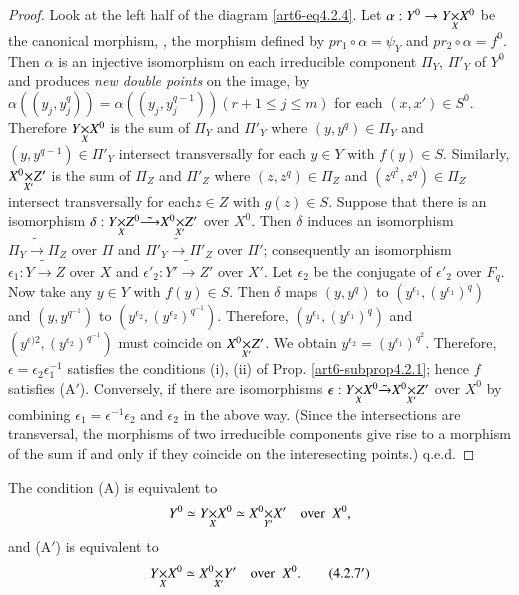 \begin{proof}
Look at the left half of the diagram \eqref{art6-eq4.2.4}. Let $\alpha : Y^0 \to \fprod{Y}{X^0}{X}$ be the canonical morphism, \ie, the morphism defined by $pr_1 \circ \alpha = \psi_Y$ and $pr_2 \circ \alpha = f^0$. Then $\alpha$ is an injective isomorphism on each irreducible component $\Pi_Y$, $\Pi'_Y$ of $Y^0$ and produces \textit{new double points} on the image, by $\alpha((y_j, y^q_j)) = \alpha ((y_j, y_j^{q-1})) (r + 1 \leqslant j \leqslant m)$ for each $(x, x') \in S^0$. Therefore $\fprod{Y}{X^0}{X}$ is the sum of $\Pi_Y$ and $\Pi'_Y$ where $(y, y^q) \in \Pi_Y$ and $(y, y^{q-1}) \in \Pi'_Y$ intersect transversally for each $y \in Y$ with $f (y) \in S$. Similarly, $\fprod{X^0}{Z'}{X'}$ is the sum of $\Pi_Z$ and $\Pi'_Z$ where  $(z,z^q) \in \Pi_Z$ and $(z^{q^2}, z^q) \in \Pi_Z$ intersect transversally for each\pageoriginale $z \in Z$ with $g(z) \in S$. Suppose that there is an isomorphism $\delta: \fprod{Y}{Z^0}{X} \tilde{\longrightarrow} \fprod{X^0}{Z'}{X'}$ over $X^0$. Then $\delta$ induces an isomorphism $\Pi_Y \tilde{\longrightarrow} \Pi_Z$ over $\Pi$ and $\Pi'_Y \tilde{\longrightarrow} \Pi'_Z$ over $\Pi'$; consequently an isomorphism $\epsilon_1 : Y \tilde{\longrightarrow} Z$ over $X$ and $\epsilon'_2 : Y' \tilde{\longrightarrow} Z'$ over $X'$. Let $\epsilon_2$ be the conjugate of $\epsilon'_2$ over $F_q$. Now take any $y \in Y$ with $f(y) \in S$. Then $\delta$ maps $(y, y^q)$ to $(y^{\epsilon_1}, (y^{\epsilon_1})^q)$ and $(y, y^{q^{-1}})$ to $(y^{\epsilon_2}, (y^{\epsilon_2})^{q^{-1}})$. Therefore, $(y^{\epsilon_1}, (y^{\epsilon_1})^q)$ and $(y^{\epsilon)2}, (y^{\epsilon_2})^{q^{-1}})$ must coincide on $\fprod{X^0}{Z'}{X'}$. We obtain $y^{\epsilon_2} = (y^{\epsilon_1})^{q^2}$. Therefore, $\epsilon = \epsilon_2 \epsilon^{-1}_1$ satisfies the conditions (i), (ii) of Prop. \ref{art6-subprop4.2.1}; hence $f$ satisfies (A$'$). Conversely, if there are isomorphisms $\epsilon: \fprod{Y}{X^0}{X} \tilde{\to} \fprod{X^0}{Z'}{X'}$ over $X^0$ by combining $\epsilon_1 = \epsilon^{-1} \epsilon_2$ and $\epsilon_2$ in the above way. (Since the intersections are transversal, the morphisms of two irreducible components give rise to a morphism of the sum if and only if they coincide on the interesecting points.) q.e.d.
\end{proof}

\begin{coro*}
The condition (A) is equivalent to 
\setcounter{equation}{6}
\begin{equation}
Y^0 \simeq \fprod{Y}{X^0}{X} \simeq \fprod{X^0}{X'}{Y'} \quad \text{over } \;X^0,
\label{art6-eq4.2.7}
\end{equation}
and (A$'$) is equivalent to
\begin{equation*}
\fprod{Y}{X^0}{X} \simeq \fprod{X^0}{Y'}{X'} \quad \text{over } \; X^0.\tag{4.2.7$'$}
\label{art6-eq4.2.7'}
\end{equation*}
\end{coro*}

